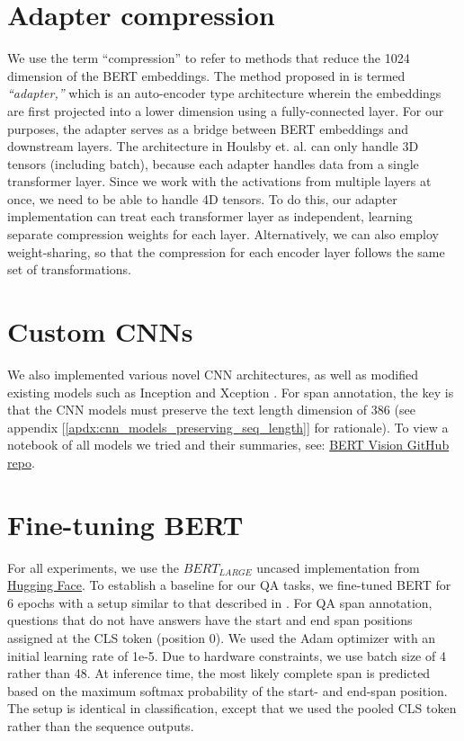 \section{Adapter compression}

We use the term “compression” to refer to methods that reduce the 1024 dimension of the BERT embeddings. The method proposed in \cite{DBLP:journals/corr/abs-1902-00751} is termed \textit{“adapter,”} which is an auto-encoder type architecture wherein the embeddings are first projected into a lower dimension using a fully-connected layer. For our purposes, the adapter serves as a bridge between BERT embeddings and downstream layers. The architecture in Houlsby et. al. can only handle 3D tensors (including batch), because each adapter handles data from a single transformer layer. Since we work with the activations from multiple layers at once, we need to be able to handle 4D tensors. To do this, our adapter implementation can treat each transformer layer as independent, learning separate compression weights for each layer. Alternatively, we can also employ weight-sharing, so that the compression for each encoder layer follows the same set of transformations.

\section{Custom CNNs}

We also implemented various novel CNN architectures, as well as modified existing models such as Inception and Xception \citep{DBLP:journals/corr/SzegedyLJSRAEVR14, DBLP:journals/corr/Chollet16a}. For span annotation, the key is that the CNN models must preserve the text length dimension of 386 (see appendix [\ref{apdx:cnn_models_preserving_seq_length}] for rationale). To view a notebook of all models we tried and their summaries, see: \href{https://github.com/cbenge509/BERTVision}{BERT Vision GitHub repo}.

\section{Fine-tuning BERT}

For all experiments, we use the $BERT_{LARGE}$ uncased implementation from \href{https://huggingface.co/}{Hugging Face}. To establish a baseline for our QA tasks, we fine-tuned BERT for 6 epochs with a setup similar to that described in \cite{Devlin2019}. For QA span annotation, questions that do not have answers have the start and end span positions assigned at the CLS token (position 0). We used the Adam optimizer with an initial learning rate of 1e-5. Due to hardware constraints, we use batch size of 4 rather than 48. At inference time, the most likely complete span is predicted based on the maximum softmax probability of the start- and end-span position. The setup is identical in classification, except that we used the pooled CLS token rather than the sequence outputs.

